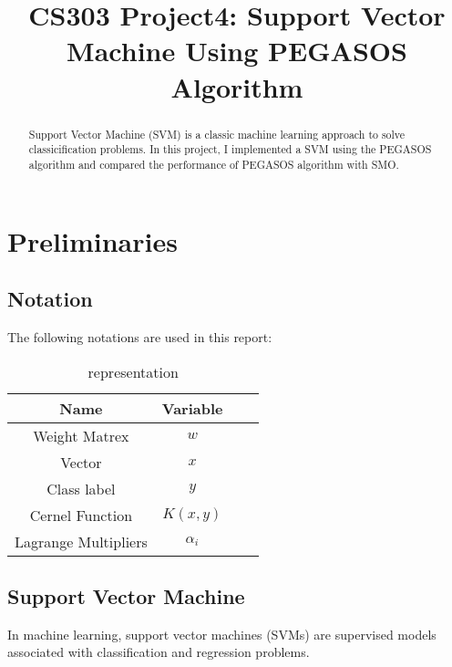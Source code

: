 \documentclass[conference]{IEEEtran}
\begin{document}
  
  \title{CS303 Project4: Support Vector Machine Using PEGASOS Algorithm}
  
  \author{
  }
  
  \maketitle
  
  \begin{abstract}
    Support Vector Machine (SVM) is a classic machine learning approach to solve classicification problems. In this project, I implemented a SVM using the PEGASOS algorithm and compared the performance of PEGASOS algorithm with SMO.
  \end{abstract}
  \IEEEpeerreviewmaketitle
  
  \section{Preliminaries}
    \subsection{Notation}
    The following notations are used in this report:
    \begin{table}[H]
        \caption{representation}
        \centering
        \begin{tabular}{cccc}
        \toprule
        Name&Variable\\
        \midrule
        Weight Matrex&$w$\\
        Vector&$x$\\
        Class label&$y$\\
        Cernel Function&$K(x,y)$\\
        Lagrange Multipliers&$\alpha_i$\\
            
        \bottomrule
        \end{tabular}
        \label{table:1}
        \end{table}
    \subsection{Support Vector Machine}
    In machine learning, support vector machines (SVMs) are supervised models associated with classification and regression problems.
\end{document}
